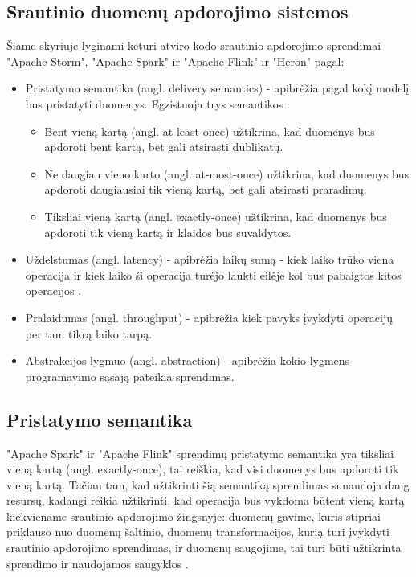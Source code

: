 \documentclass{VUMIFPSbakalaurinis}
\begin{document}
\subsection{Srautinio duomenų apdorojimo sistemos}

Šiame skyriuje lyginami keturi atviro kodo srautinio apdorojimo sprendimai "Apache Storm", "Apache Spark" ir "Apache Flink" ir "Heron" pagal:
\begin{itemize}
    \item Pristatymo semantika (angl. delivery semantics) - apibrėžia pagal kokį modelį bus pristatyti duomenys. Egzistuoja trys semantikos \cite{ensar20}: 
    \begin{itemize}
        \item Bent vieną kartą (angl. at-least-once) užtikrina, kad duomenys bus apdoroti bent kartą, bet gali atsirasti dublikatų. 
        \item Ne daugiau vieno karto (angl. at-most-once) užtikrina, kad duomenys bus apdoroti daugiausiai tik vieną kartą, bet gali atsirasti praradimų. 
        \item Tiksliai vieną kartą (angl. exactly-once) užtikrina, kad duomenys bus apdoroti tik vieną kartą ir klaidos bus suvaldytos.
    \end{itemize}
    \item Uždelstumas (angl. latency) - apibrėžia laikų sumą - kiek laiko trūko viena operacija ir kiek laiko ši operacija turėjo laukti eilėje kol bus pabaigtos kitos operacijos \cite{karimov2018benchmarking}.
    \item Pralaidumas (angl. throughput) - apibrėžia kiek pavyks įvykdyti operacijų per tam tikrą laiko tarpą.
    \item Abstrakcijos lygmuo (angl. abstraction) - apibrėžia kokio lygmens programavimo sąsają pateikia sprendimas.
\end{itemize}

\subsection{Pristatymo semantika}
"Apache Spark" ir "Apache Flink" sprendimų pristatymo semantika yra tiksliai vieną kartą (angl. exactly-once), tai reiškia, kad visi duomenys bus apdoroti tik vieną kartą. Tačiau tam, kad užtikrinti šią semantiką sprendimas sunaudoja daug resursų, kadangi reikia užtikrinti, kad operacija bus vykdoma būtent vieną kartą kiekviename srautinio apdorojimo žingsnyje: duomenų gavime, kuris stipriai priklauso nuo duomenų šaltinio, duomenų transformacijos, kurią turi įvykdyti srautinio apdorojimo sprendimas, ir duomenų saugojime, tai turi būti užtikrinta sprendimo ir naudojamos saugyklos \cite{zhang20}.\par
\end{document}
